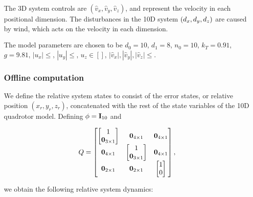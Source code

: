 The 3D system controls are $(\hat v_x, \hat v_y, \hat v_z)$, and represent the velocity in each positional dimension. 
The disturbances in the 10D system $(d_x, d_y, d_z)$ are caused by wind, which acts on the velocity in each dimension. 

The model parameters are chosen to be $d_0=10$, $d_1=8$, $n_0=10$, $k_T=0.91$, $g=9.81$, $|u_x| \le $, $|u_y| \le $, $u_z \in []$, $|\hat v_x|, |\hat v_y|, |\hat v_z| \le $.

\subsubsection{Offline computation}
We define the relative system states to consist of the error states, or relative position $(x_r, y_r, z_r)$, concatenated with the rest of the state variables of the 10D quadrotor model.
Defining $\phi = \mathbf I_{10}$ and 

\begin{equation*}
Q = 
\begin{bmatrix}
  \begin{bmatrix} 1 \\ \mathbf 0_{3 \times 1} \end{bmatrix} 
    & \mathbf 0_{4\times 1} 
    & \mathbf 0_{4\times 1} \\
  \mathbf 0_{4\times 1} 
    & \begin{bmatrix} 1 \\ \mathbf 0_{3 \times 1} \end{bmatrix} 
    &  \mathbf 0_{4\times 1} \\
  \mathbf 0_{2\times 1} 
    & \mathbf 0_{2\times 1} 
    & \begin{bmatrix} 1 \\ 0 \end{bmatrix}
\end{bmatrix},
\end{equation*}

\noindent we obtain the following relative system dynamics:

